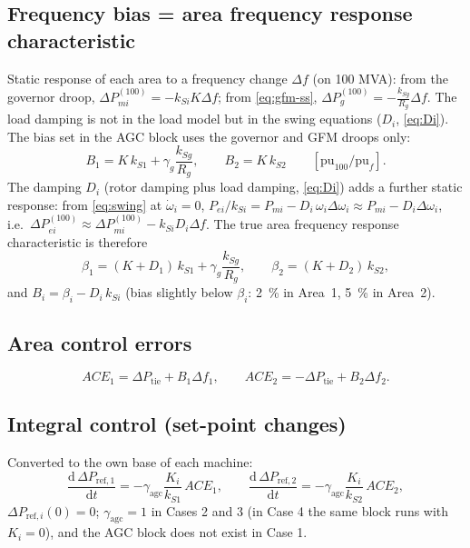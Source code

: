 \documentclass[11pt,a4paper]{article}
\numberwithin{equation}{section}
\newcommand{\dd}{\mathrm{d}}
\begin{document}
\subsection{Frequency bias = area frequency response characteristic}
Static response of each area to a frequency change $\Delta f$ (on 100 MVA): from the governor droop, $\Delta P_{mi}^{(100)} = -k_{Si}K\Delta f$; from \eqref{eq:gfm-ss}, $\Delta P_g^{(100)} = -\frac{k_{Sg}}{R_g}\Delta f$. The load damping is not in the load model but in the swing equations ($D_i$, \eqref{eq:Di}). The bias set in the AGC block uses the governor and GFM droops only:
\begin{equation}
\boxed{B_1 = K\,k_{S1} + \gamma_g\frac{k_{Sg}}{R_g},\qquad B_2 = K\,k_{S2}\qquad[\text{pu}_{100}/\text{pu}_f].}
\end{equation}
The damping $D_i$ (rotor damping plus load damping, \eqref{eq:Di}) adds a further static response: from \eqref{eq:swing} at $\dot\omega_i=0$, $P_{ei}/k_{Si} = P_{mi} - D_i\,\omega_i\Delta\omega_i \approx P_{mi} - D_i\Delta\omega_i$, i.e.\ $\Delta P_{ei}^{(100)} \approx \Delta P_{mi}^{(100)} - k_{Si}D_i\Delta f$. The true area frequency response characteristic is therefore
\begin{equation}
\beta_1 = (K+D_1)\,k_{S1} + \gamma_g\frac{k_{Sg}}{R_g},\qquad \beta_2 = (K+D_2)\,k_{S2},
\end{equation}
and $B_i = \beta_i - D_i\,k_{Si}$ (bias slightly below $\beta_i$: 2~\% in Area~1, 5~\% in Area~2).

\subsection{Area control errors}
\begin{equation}
\boxed{ACE_1 = \Delta P_{\text{tie}} + B_1\Delta f_1,\qquad ACE_2 = -\Delta P_{\text{tie}} + B_2\Delta f_2 .}
\end{equation}

\subsection{Integral control (set-point changes)}
Converted to the own base of each machine:
\begin{equation}
\boxed{\frac{\dd\,\Delta P_{\text{ref},1}}{\dd t} = -\gamma_{\text{agc}}\frac{K_i}{k_{S1}}\,ACE_1,\qquad
\frac{\dd\,\Delta P_{\text{ref},2}}{\dd t} = -\gamma_{\text{agc}}\frac{K_i}{k_{S2}}\,ACE_2,}
\end{equation}
$\Delta P_{\text{ref},i}(0)=0$; $\gamma_{\text{agc}}=1$ in Cases 2 and 3 (in Case 4 the same block runs with $K_i=0$), and the AGC block does not exist in Case 1.
\end{document}
